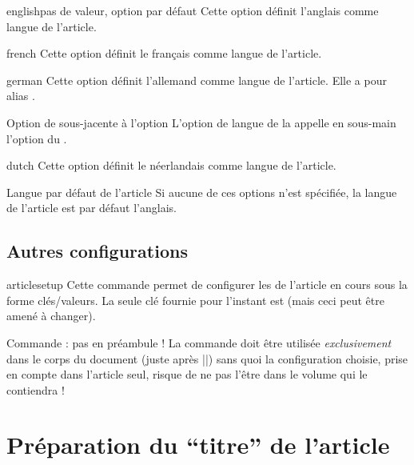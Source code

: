 \begin{docKey}{english}{}{pas de valeur, option par défaut}
  Cette option définit l'anglais comme langue de l'article.
\end{docKey}
\begin{docKey}{french}{}{}
  Cette option définit le français comme langue de l'article.
\end{docKey}
\begin{docKey}{german}{}{}
  Cette option définit l'allemand comme langue de l'article. Elle a pour alias
  .
  \begin{dbremark}{Option de  sous-jacente à l'option
      \protect{}}{}
    L'option de langue  de la \nwejmauthorcl{} appelle en
    sous-main l'option  du .
  \end{dbremark}
  \begin{docKey}{dutch}{}{}
  Cette option définit le néerlandais comme langue de l'article.
\end{docKey}
\end{docKey}

\begin{dbremark}{Langue par défaut de l'article}{}
  Si aucune de ces options n'est spécifiée, la langue de l'article est par
  défaut l'anglais.
\end{dbremark}

\subsection{Autres configurations}
\label{sec:autr-conf}

\begin{docCommand}{articlesetup}{}
  Cette commande permet de configurer les  de l'article en cours
  sous la forme clés/valeurs. La seule clé fournie pour l'instant est
   (mais ceci peut être amené à changer).
\end{docCommand}

\begin{dbwarning}{Commande \protect{} : pas en préambule !}{}
  La commande  doit être utilisée \emph{exclusivement} dans
  le corps du document (juste après ||) sans quoi la
    configuration choisie, prise en compte dans l'article seul, risque de ne pas
    l'être dans le volume qui le contiendra !
\end{dbwarning}

\section{Préparation du \enquote{titre} de l'article}
\label{sec-prep-de-lart}

